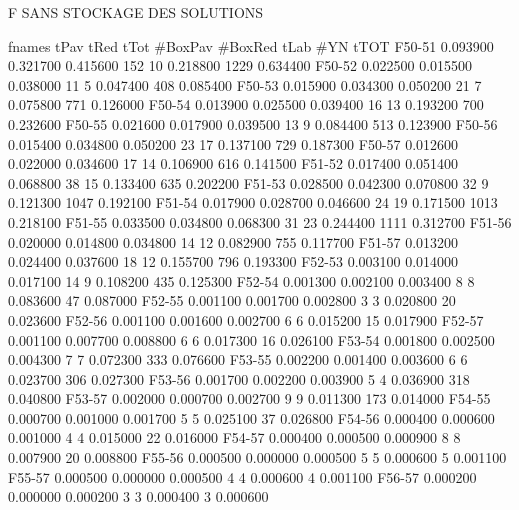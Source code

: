 F SANS STOCKAGE DES SOLUTIONS


      fnames         tPav         tRed         tTot    #BoxPav    #BoxRed         tLab        #YN         tTOT
      F50-51     0.093900     0.321700     0.415600        152         10     0.218800       1229     0.634400
      F50-52     0.022500     0.015500     0.038000         11          5     0.047400        408     0.085400
      F50-53     0.015900     0.034300     0.050200         21          7     0.075800        771     0.126000
      F50-54     0.013900     0.025500     0.039400         16         13     0.193200        700     0.232600
      F50-55     0.021600     0.017900     0.039500         13          9     0.084400        513     0.123900
      F50-56     0.015400     0.034800     0.050200         23         17     0.137100        729     0.187300
      F50-57     0.012600     0.022000     0.034600         17         14     0.106900        616     0.141500
      F51-52     0.017400     0.051400     0.068800         38         15     0.133400        635     0.202200
      F51-53     0.028500     0.042300     0.070800         32          9     0.121300       1047     0.192100
      F51-54     0.017900     0.028700     0.046600         24         19     0.171500       1013     0.218100
      F51-55     0.033500     0.034800     0.068300         31         23     0.244400       1111     0.312700
      F51-56     0.020000     0.014800     0.034800         14         12     0.082900        755     0.117700
      F51-57     0.013200     0.024400     0.037600         18         12     0.155700        796     0.193300
      F52-53     0.003100     0.014000     0.017100         14          9     0.108200        435     0.125300
      F52-54     0.001300     0.002100     0.003400          8          8     0.083600         47     0.087000
      F52-55     0.001100     0.001700     0.002800          3          3     0.020800         20     0.023600
      F52-56     0.001100     0.001600     0.002700          6          6     0.015200         15     0.017900
      F52-57     0.001100     0.007700     0.008800          6          6     0.017300         16     0.026100
      F53-54     0.001800     0.002500     0.004300          7          7     0.072300        333     0.076600
      F53-55     0.002200     0.001400     0.003600          6          6     0.023700        306     0.027300
      F53-56     0.001700     0.002200     0.003900          5          4     0.036900        318     0.040800
      F53-57     0.002000     0.000700     0.002700          9          9     0.011300        173     0.014000
      F54-55     0.000700     0.001000     0.001700          5          5     0.025100         37     0.026800
      F54-56     0.000400     0.000600     0.001000          4          4     0.015000         22     0.016000
      F54-57     0.000400     0.000500     0.000900          8          8     0.007900         20     0.008800
      F55-56     0.000500     0.000000     0.000500          5          5     0.000600          5     0.001100
      F55-57     0.000500     0.000000     0.000500          4          4     0.000600          4     0.001100
      F56-57     0.000200     0.000000     0.000200          3          3     0.000400          3     0.000600


